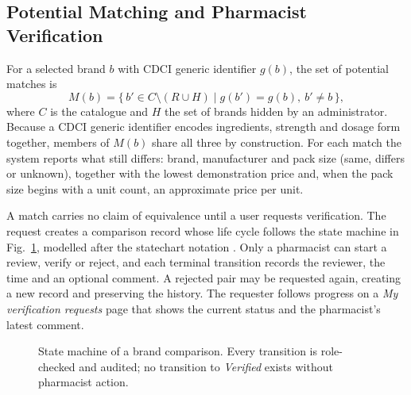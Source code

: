 \documentclass[conference]{IEEEtran}
\begin{document}
\subsection{Potential Matching and Pharmacist Verification}
For a selected brand $b$ with CDCI generic identifier $g(b)$, the set of potential matches is
\begin{equation}
M(b)=\{\,b' \in C\setminus(R\cup H) \mid g(b')=g(b),\ b'\neq b\,\},
\label{eq:match}
\end{equation}
where $C$ is the catalogue and $H$ the set of brands hidden by an administrator. Because a CDCI generic identifier encodes ingredients, strength and dosage form together, members of $M(b)$ share all three by construction. For each match the system reports what still differs: brand, manufacturer and pack size (same, differs or unknown), together with the lowest demonstration price and, when the pack size begins with a unit count, an approximate price per unit.

A match carries no claim of equivalence until a user requests verification. The request creates a comparison record whose life cycle follows the state machine in Fig.~\ref{fig:states}, modelled after the statechart notation \cite{harel1987}. Only a pharmacist can start a review, verify or reject, and each terminal transition records the reviewer, the time and an optional comment. A rejected pair may be requested again, creating a new record and preserving the history. The requester follows progress on a \emph{My verification requests} page that shows the current status and the pharmacist's latest comment.

\begin{figure}[!t]
\centering
{}
\caption{State machine of a brand comparison. Every transition is role-checked and audited; no transition to \emph{Verified} exists without pharmacist action.}
\label{fig:states}
\end{figure}
\end{document}
